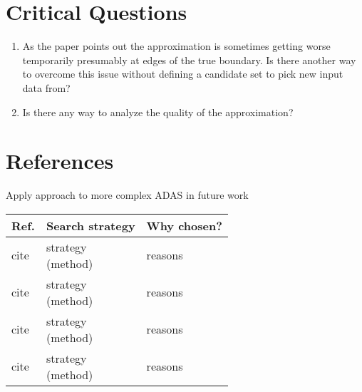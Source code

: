 \documentclass[oneside, notitlepage, twocolumn]{scrartcl}
\newcommand{\tableheadline}[1]{\textbf{#1}}
\newcommand{\draft}[1]{\textcolor{red}{\textit{#1}}}
\begin{document}
\section{Critical Questions}
\begin{enumerate}
    \item As the paper points out the approximation is sometimes getting worse temporarily presumably at edges of the true boundary.
        Is there another way to overcome this issue without defining a candidate set to pick new input data from?
    \item Is there any way to analyze the quality of the approximation?
\end{enumerate}

\section{References}
\begingroup
\renewcommand{\section}[2]{}%
\nocite{*}
\printbibliography%
\endgroup

\section{Related Work}
\draft{Apply approach to more complex ADAS in future work}
\begin{adjustbox}{angle=90}
\begin{tabularx}{\textwidth}{llX}
    \tableheadline{Ref.} & \tableheadline{Search strategy} & \tableheadline{Why chosen?}\\
    \midrule
    cite & \makecell{strategy\\(method)} & reasons\\
    \midrule
    cite & \makecell{strategy\\(method)} & reasons\\
    \midrule
    cite & \makecell{strategy\\(method)}& reasons\\
    \midrule
    cite & \makecell{strategy\\(method)}& reasons\\
\end{tabularx}
\end{adjustbox}
\end{document}
